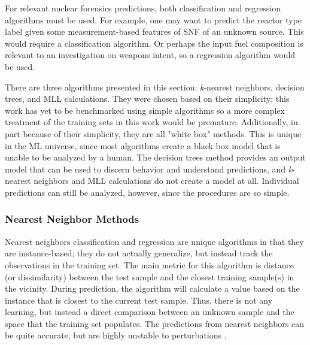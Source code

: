 
For relevant nuclear forensics predictions, both classification and regression
algorithms must be used.  For example, one may want to predict the reactor type
label given some measurement-based features of \gls{SNF} of an unknown source.
This would require a classification algorithm. Or perhaps the input fuel
composition is relevant to an investigation on weapons intent, so a regression
algorithm would be used. 

There are three algorithms presented in this section: \textit{k}-nearest
neighbors, decision trees, and \gls{MLL} calculations. They were chosen based
on their simplicity; this work has yet to be benchmarked using simple
algorithms so a more complex treatment of the training sets in this work would
be premature. Additionally, in part because of their simplicity, they are all
"white box" methods.  This is unique in the \gls{ML} universe, since most
algorithms create a black box model that is unable to be analyzed by a human.
The  decision trees method provides an output model that can be used to discern
behavior and understand predictions, and \textit{k}-nearest neighbors and
\gls{MLL} calculations do not create a model at all. Individual predictions can
still be analyzed, however, since the procedures are so simple. 

\subsubsection{Nearest Neighbor Methods}

Nearest neighbors classification and regression are unique algorithms in
that they are instance-based; they do not actually generalize, but instead
track the observations in the training set.  The main metric for this algorithm
is distance (or dissimilarity) between the test sample and the closest training
sample(s) in the vicinity.  During prediction, the algorithm will calculate a
value based on the instance that is closest to the current test sample. Thus,
there is not any learning, but instead a direct comparison between an unknown
sample and the space that the training set populates. The predictions from
nearest neighbors can be quite accurate, but are highly unstable to
perturbations \cite{elements_stats}.

